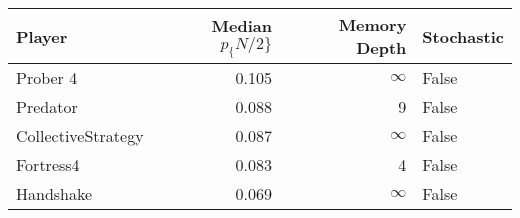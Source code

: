 \begin{tabular}{lrrl}
\toprule
             Player &  Median $p_\{N/2\}$ &  Memory Depth & Stochastic \\
\midrule
           Prober 4 &             0.105 &            \(\infty\) &      False \\
           Predator &             0.088 &             9 &      False \\
 CollectiveStrategy &             0.087 &            \(\infty\) &      False \\
          Fortress4 &             0.083 &             4 &      False \\
          Handshake &             0.069 &            \(\infty\) &      False \\
\bottomrule
\end{tabular}

